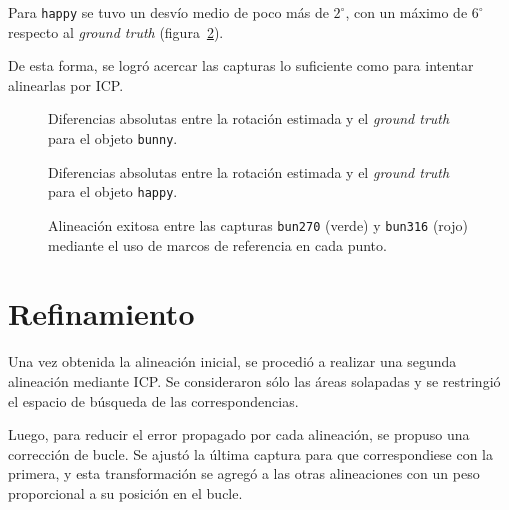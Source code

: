			Para \texttt{happy} se tuvo un desvío medio de poco más de
			$2^{\circ}$, con un máximo de $6^{\circ}$ respecto al \emph{ground truth} (figura~\ref{fig:clust_happy}).

			De esta forma, se logró acercar las capturas lo suficiente como
			para intentar alinearlas por ICP.

		\begin{figure}
			\caption{\label{fig:clust_bunny}Diferencias absolutas entre la rotación estimada y el \emph{ground truth} para el objeto \texttt{bunny}.}
		\end{figure}

		\begin{figure}
			\caption{\label{fig:clust_happy}Diferencias absolutas entre la rotación estimada y el \emph{ground truth} para el objeto \texttt{happy}.}
		\end{figure}

		\begin{figure}
			\caption{\label{fig:clust_bun_good}Alineación exitosa entre las capturas \texttt{bun270} (verde) y \texttt{bun316} (rojo) mediante el uso de marcos de referencia en cada punto.}
		\end{figure}


	\section{Refinamiento}
	Una vez obtenida la alineación inicial, se procedió a realizar una segunda
	alineación mediante ICP.
	Se consideraron sólo las áreas solapadas y se restringió el
	espacio de búsqueda de las correspondencias.

	Luego, para reducir el error propagado por cada alineación, se propuso una
	corrección de bucle.
	Se ajustó la última captura para que correspondiese con la primera, y
	esta transformación se agregó a las otras alineaciones con un peso
	proporcional a su posición en el bucle.



